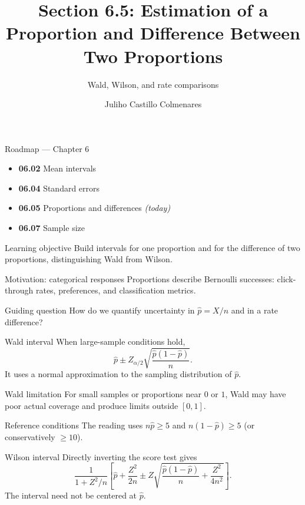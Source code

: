 \documentclass[10pt,aspectratio=169]{beamer}
\title[Proportion Intervals]{Section 6.5: Estimation of a Proportion and Difference Between Two Proportions}
\subtitle{Wald, Wilson, and rate comparisons}
\author[J. Castillo Colmenares]{Juliho Castillo Colmenares}
\institute{Tecnológico de Monterrey}
\date{}
\begin{document}
\begin{frame}[plain]\vspace{-0.8cm}\titlepage\end{frame}

\begin{frame}{Roadmap --- Chapter 6}
  \footnotesize
  \begin{itemize}\itemsep=0.08cm
    \item \textbf{06.02} Mean intervals
    \item \textbf{06.04} Standard errors
    \item \textbf{06.05} Proportions and differences \emph{(today)}
    \item \textbf{06.07} Sample size
  \end{itemize}
  \begin{block}{Learning objective}
    Build intervals for one proportion and for the difference of two proportions,
    distinguishing Wald from Wilson.
  \end{block}
\end{frame}

\begin{frame}{Motivation: categorical responses}
  \footnotesize
  Proportions describe Bernoulli successes: click-through rates, preferences,
  and classification metrics.
  \begin{alertblock}{Guiding question}
    How do we quantify uncertainty in $\hat p=X/n$ and in a rate difference?
  \end{alertblock}
\end{frame}

\begin{frame}{Wald interval}
  \footnotesize
  When large-sample conditions hold,
  \[
    \hat p\pm Z_{\alpha/2}\sqrt{\frac{\hat p(1-\hat p)}{n}}.
  \]
  It uses a normal approximation to the sampling distribution of $\hat p$.
\end{frame}

\begin{frame}{Wald limitation}
  \footnotesize
  For small samples or proportions near $0$ or $1$, Wald may have poor actual
  coverage and produce limits outside $[0,1]$.
  \begin{block}{Reference conditions}
    The reading uses $n\hat p\ge5$ and $n(1-\hat p)\ge5$ (or conservatively
    $\ge10$).
  \end{block}
\end{frame}

\begin{frame}{Wilson interval}
  \footnotesize
  Directly inverting the score test gives
  \[
  \frac{1}{1+Z^2/n}\left[\hat p+\frac{Z^2}{2n}\pm
  Z\sqrt{\frac{\hat p(1-\hat p)}{n}+\frac{Z^2}{4n^2}}\right].
  \]
  The interval need not be centered at $\hat p$.
\end{frame}
\end{document}
